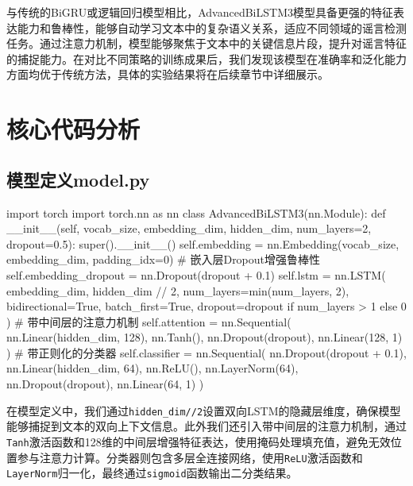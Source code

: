 \vspace{1em}
与传统的BiGRU或逻辑回归模型相比，AdvancedBiLSTM3模型具备更强的特征表达能力和鲁棒性，能够自动学习文本中的复杂语义关系，适应不同领域的谣言检测任务。通过注意力机制，模型能够聚焦于文本中的关键信息片段，提升对谣言特征的捕捉能力。在对比不同策略的训练成果后，我们发现该模型在准确率和泛化能力方面均优于传统方法，具体的实验结果将在后续章节中详细展示。

\newpage
\section{核心代码分析}

\subsection{模型定义model.py}
\begin{codeblock}[language=Python]
import torch
import torch.nn as nn
class AdvancedBiLSTM3(nn.Module):  
    def __init__(self, vocab_size, embedding_dim, hidden_dim, num_layers=2, dropout=0.5):  
        super().__init__()  
        self.embedding = nn.Embedding(vocab_size, embedding_dim, padding_idx=0)  
        # 嵌入层Dropout增强鲁棒性  
        self.embedding_dropout = nn.Dropout(dropout + 0.1) 
        self.lstm = nn.LSTM(  
            embedding_dim,  
            hidden_dim // 2,
            num_layers=min(num_layers, 2),  
            bidirectional=True,  
            batch_first=True,  
            dropout=dropout if num_layers > 1 else 0  
        )  
        # 带中间层的注意力机制  
        self.attention = nn.Sequential(  
            nn.Linear(hidden_dim, 128),  
            nn.Tanh(),  
            nn.Dropout(dropout),  
            nn.Linear(128, 1)  
        )  
        # 带正则化的分类器  
        self.classifier = nn.Sequential(  
            nn.Dropout(dropout + 0.1),  
            nn.Linear(hidden_dim, 64),  
            nn.ReLU(),  
            nn.LayerNorm(64),  
            nn.Dropout(dropout),  
            nn.Linear(64, 1)  
        )  
\end{codeblock}

在模型定义中，我们通过\verb|hidden_dim//2|设置双向LSTM的隐藏层维度，确保模型能够捕捉到文本的双向上下文信息。此外我们还引入带中间层的注意力机制，通过\verb|Tanh|激活函数和128维的中间层增强特征表达，使用掩码处理填充值，避免无效位置参与注意力计算。分类器则包含多层全连接网络，使用\verb|ReLU|激活函数和\verb|LayerNorm|归一化，最终通过\verb|sigmoid|函数输出二分类结果。

\vspace{1em}
